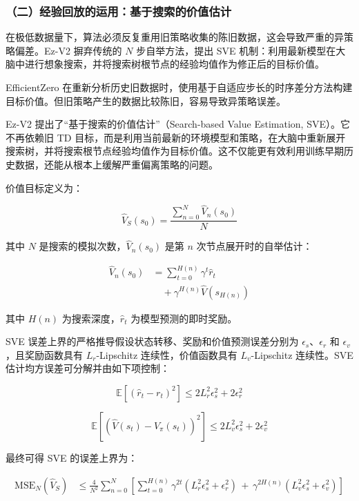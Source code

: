 \hypertarget{ux4e8cux7ecfux9a8cux56deux653eux7684ux8fd0ux7528ux57faux4e8eux641cux7d22ux7684ux4ef7ux503cux4f30ux8ba1}{%
\subsubsection{（二）经验回放的运用：基于搜索的价值估计}\label{ux4e8cux7ecfux9a8cux56deux653eux7684ux8fd0ux7528ux57faux4e8eux641cux7d22ux7684ux4ef7ux503cux4f30ux8ba1}}

在极低数据量下，算法必须反复重用旧策略收集的陈旧数据，这会导致严重的异策略偏差。Ez-V2 摒弃传统的 \(N\) 步自举方法，提出 SVE 机制：利用最新模型在大脑中进行想象搜索，并将搜索树根节点的经验均值作为修正后的目标价值。

EfficientZero 在重新分析历史旧数据时，使用基于自适应步长的时序差分方法构建目标价值。但旧策略产生的数据比较陈旧，容易导致异策略误差。

Ez-V2 提出了``基于搜索的价值估计''（Search-based Value Estimation, SVE）。它不再依赖旧 TD 目标，而是利用当前最新的环境模型和策略，在大脑中重新展开搜索树，并将搜索根节点经验均值作为目标价值。这不仅能更有效利用训练早期历史数据，还能从根本上缓解严重偏离策略的问题。

价值目标定义为：

\[
\hat{V}_S(s_0)
= \frac{\sum_{n=0}^{N} \hat{V}_n(s_0)}{N}
\]

其中 \(N\) 是搜索的模拟次数，\(\hat{V}_n(s_0)\) 是第 \(n\) 次节点展开时的自举估计：

\[
\begin{aligned}
\hat{V}_n(s_0)
&= \sum_{t=0}^{H(n)}
\gamma^t \hat{r}_t
\\
&\quad + \gamma^{H(n)} \hat{V}(s_{H(n)})
\end{aligned}
\]

其中 \(H(n)\) 为搜索深度，\(\hat{r}_t\) 为模型预测的即时奖励。

SVE 误差上界的严格推导假设状态转移、奖励和价值预测误差分别为 \(\epsilon_s\)、\(\epsilon_r\) 和 \(\epsilon_v\)，且奖励函数具有 \(L_r\)-Lipschitz 连续性，价值函数具有 \(L_v\)-Lipschitz 连续性。SVE 估计均方误差可分解并由如下项控制：

\[
\mathbb{E}\left[(\hat{r}_t - r_t)^2\right]
\le 2L_r^2 \epsilon_s^2 + 2\epsilon_r^2
\]

\[
\mathbb{E}\left[(\hat{V}(s_t) - V_\pi(s_t))^2\right]
\le 2L_v^2 \epsilon_s^2 + 2\epsilon_v^2
\]

最终可得 SVE 的误差上界为：

\[
\begin{aligned}
\mathrm{MSE}_N(\hat{V}_S)
&\le
\frac{4}{N^2}
\sum_{n=0}^{N}
\left[
\sum_{t=0}^{H(n)}
\gamma^{2t}(L_r^2\epsilon_s^2 + \epsilon_r^2)
\, + \, \gamma^{2H(n)}(L_v^2\epsilon_s^2 + \epsilon_v^2)
\right]
\end{aligned}
\]

